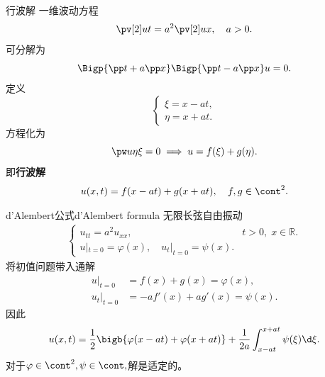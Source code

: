 \begin{example}
	{行波解}{}
	一维波动方程
	\[
		\pv[2]ut=a^2\pv[2]ux,\quad a>0.
	\]
	可分解为
	\[
		\Bigp{\pp t+a\pp x}\Bigp{\pp t-a\pp x}u=0.
	\]
	定义
	\[
		\begin{cases}
			\xi=x-at, \\
			\eta=x+at.
		\end{cases}
	\]
	方程化为
	\[
		\pw u\eta\xi=0\implies u=f(\xi)+g(\eta).
	\]
	即\textbf{行波解}
	\begin{align}
		u(x,t)=f(x-at)+g(x+at),\quad f,g\in\cont^2.
	\end{align}
\end{example}
\begin{theorem}{d'Alembert公式}{d'Alembert formula}
	无限长弦自由振动
	\begin{align*}
		\begin{cases}
			u_{tt}=a^2u_{xx},&t>0,\;x\in\mathbb R. \\
			u|_{t=0}=\varphi(x),\quad u_t|_{t=0}=\psi(x).
		\end{cases}
	\end{align*}
	将初值问题带入通解
	\begin{align*}
		u|_{t=0}   & =f(x)+g(x)=\varphi(x),   \\
		u_t|_{t=0} & =-af'(x)+ag'(x)=\psi(x).
	\end{align*}
	因此
	\begin{align}
		u(x,t)=\frac12\bigb{\varphi(x-at)+\varphi(x+at)}+\frac1{2a}\int_{x-at}^{x+at}\psi(\xi)\d\xi.
	\end{align}
	对于$\varphi\in\cont^2,\psi\in\cont,$解是适定的。
\end{theorem}

